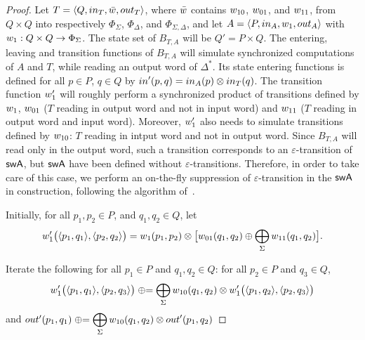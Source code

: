 \begin{proof}
Let $T = \< Q, \init_T, \bar{\wei}, \final_T >$,
where $\bar{\wei}$ contains $\wei_{10}$, $\wei_{01}$, and $\wei_{11}$,
from $Q \times Q$ into respectively 
$\Phi_{\Sigma}$, $\Phi_{\Delta}$, and $\Phi_{\Sigma, \Delta}$,
and let $A = \< P, \init_A, \wei_1, \final_A >$
with $\wei_1: Q \times Q \to \Phi_{\Sigma}$.
%
\noindent
The state set of $B_{T, A}$ will be $Q' = P \times Q$.
The entering, leaving and transition functions of $B_{T, A}$ will 
simulate synchronized computations of $A$ and $T$, 
while reading an output word of $\Delta^*$.
%
Its state entering functions is defined 
for all $p \in P$, $q \in Q$ 
by $\init'(p, q) = \init_A(p) \otimes \init_T(q)$.
The transition function $\wei'_1$ will roughly perform 
a synchronized product of transitions defined by $\wei_1$, 
$\wei_{01}$ ($T$ reading in output word and not in input word)
and $\wei_{11}$ ($T$ reading in output word and input word).
%
Moreover, $\wei'_1$ also needs to simulate transitions 
defined by $\wei_{10}$: $T$ reading in intput word and not in output word.
Since $B_{T, A}$  will read only in the output word, such a transition corresponds
to an $\varepsilon$-transition of $\textsf{swA}$, 
but $\textsf{swA}$ have been defined without $\varepsilon$-transitions.
Therefore, in order to take care of this case, we perform an on-the-fly
suppression of $\varepsilon$-transition in the $\textsf{swA}$ in construction, 
following the algorithm of~\cite{LombardySakarovitch12ciaa}. 
%


\noindent
Initially, for all $p_1, p_2 \in P$, and $q_1, q_2 \in Q$, let
\[
\wei'_1\bigl( \< p_1, q_1>, \< p_2, q_2>\bigr) = 
\wei_1(p_1, p_2) \otimes
\bigl[
\wei_{01}(q_1, q_2) 
\oplus
\displaystyle\bigoplus_{\Sigma}
\wei_{11}(q_1, q_2) 
\bigr].
\]

\noindent
Iterate the following for all $p_1\in P$ and $q_1, q_2 \in Q$:
for all $p_2\in P$ and $q_3 \in Q$,
\[
\wei'_1\bigl( \< p_1, q_1>, \< p_2, q_3>\bigr) \opluseq 
\displaystyle\bigoplus_{\Sigma} \wei_{10}(q_1, q_2) 
\otimes 
\wei'_1\bigl( \< p_1, q_2>, \< p_2, q_3>\bigr)
\]
and
\(
\final'(p_1, q_1) \opluseq 
\displaystyle\bigoplus_{\Sigma} \wei_{10}(q_1, q_2) 
\otimes \final'(p_1, q_2)
\) 
\end{proof}

